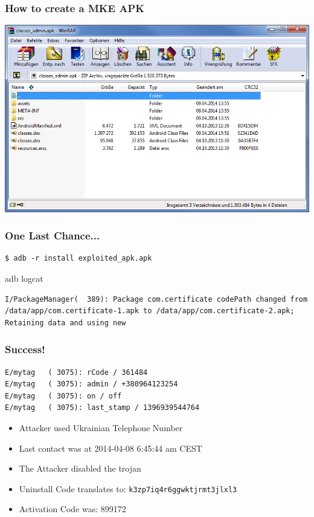 \documentclass[12pt,a4paper]{beamer}
\begin{document}
\begin{frame}
\frametitle{How to create a MKE APK}
\centering
\includegraphics[width=\textwidth]{images/after-mke.png}
\end{frame}

\begin{frame}[fragile]
\frametitle{One Last Chance...}

\begin{lstlisting}
$ adb -r install exploited_apk.apk
\end{lstlisting}

adb logcat
\begin{lstlisting}
I/PackageManager(  389): Package com.certificate codePath changed from /data/app/com.certificate-1.apk to /data/app/com.certificate-2.apk; Retaining data and using new
\end{lstlisting}

\end{frame}


\begin{frame}[fragile]
\frametitle{Success!}

\begin{lstlisting}
E/mytag   ( 3075): rCode / 361484
E/mytag   ( 3075): admin / +380964123254
E/mytag   ( 3075): on / off
E/mytag   ( 3075): last_stamp / 1396939544764
\end{lstlisting}

\begin{itemize}
	\item Attacker used Ukrainian Telephone Number
	\item Last contact was at 2014-04-08 6:45:44 am CEST
	\item The Attacker disabled the trojan
	\item Uninstall Code translates to: \texttt{k3zp7iq4r6ggwktjrmt3jlxl3}
	\item Activation Code was: 899172
\end{itemize}

\end{frame}
\end{document}
